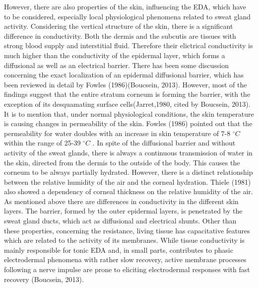 However, there are also properties of the skin, influencing the EDA, which have to be considered, especially local physiological phenomena related to sweat gland activity. Considering the vertical structure of the skin, there is a significant difference in conductivity. Both the dermis and the subcutis are tissues with strong blood supply and interstitial fluid. Therefore their elictrical conductivity is much higher than the conductivity of the epidermal layer, which forms a diffusional as well as an electrical barrier. There has been some discussion concerning the exact localization of an epidermal diffusional barrier, which has been reviewed in detail by Fowles (1986)(Boucsein, 2013). However, most of the findings suggest that the entire stratum corneum is forming the barrier, with the exception of its desquamating surface cells(Jarret,1980, cited by Boucsein, 2013). 
It is to mention that, under normal physiological conditions, the skin temperature is causing changes in permeability of the skin. Fowles (1986) pointed out that the permeability for water doubles with an increase in skin temperature of 7-8  $^{\circ}C$  within the range of 25-39 $^{\circ}C$ . In spite of the diffusional barrier and without activity of the sweat glands, there is always a continuous transmission of water in the skin, directed from the dermis to the outside of the body. This causes the corneum to be always partially hydrated. However, there is a distinct relationship between the relative humidity of the air and the corneal hydration.
Thiele (1981) also showed a dependency of corneal thickness on the relative humidity of the air. As mentioned above there are differences in conductivity in the different skin layers. The barrier, formed by the outer epidermal layers, is penetrated by the sweat gland ducts, which act as diffusional and electrical shunts.
Other than these properties, concerning the resistance, living tissue has capacitative features which are related to the activity of its membranes. While tissue conductivity is mainly responsible for tonic EDA and, in small parts, contributes to phasic electrodermal phenomena with rather slow recovery, active membrane processes following a nerve impulse are prone to eliciting electrodermal responses with fast recovery (Boucsein, 2013).


